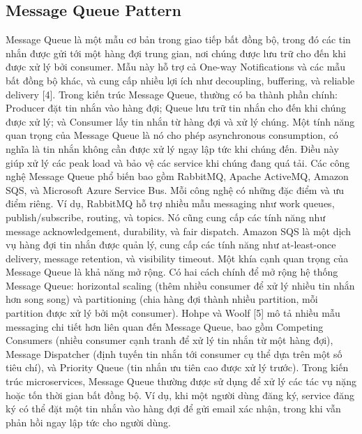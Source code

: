 \subsection{Message Queue Pattern}
Message Queue là một mẫu cơ bản trong giao tiếp bất đồng bộ, trong đó các tin nhắn được gửi tới một hàng đợi trung gian, nơi chúng được lưu trữ cho đến khi được xử lý bởi consumer. Mẫu này hỗ trợ cả One-way Notifications và các mẫu bất đồng bộ khác, và cung cấp nhiều lợi ích như decoupling, buffering, và reliable delivery [4].
Trong kiến trúc Message Queue, thường có ba thành phần chính: Producer đặt tin nhắn vào hàng đợi; Queue lưu trữ tin nhắn cho đến khi chúng được xử lý; và Consumer lấy tin nhắn từ hàng đợi và xử lý chúng. Một tính năng quan trọng của Message Queue là nó cho phép asynchronous consumption, có nghĩa là tin nhắn không cần được xử lý ngay lập tức khi chúng đến. Điều này giúp xử lý các peak load và bảo vệ các service khi chúng đang quá tải.
Các công nghệ Message Queue phổ biến bao gồm RabbitMQ, Apache ActiveMQ, Amazon SQS, và Microsoft Azure Service Bus. Mỗi công nghệ có những đặc điểm và ưu điểm riêng. Ví dụ, RabbitMQ hỗ trợ nhiều mẫu messaging như work queues, publish/subscribe, routing, và topics. Nó cũng cung cấp các tính năng như message acknowledgement, durability, và fair dispatch. Amazon SQS là một dịch vụ hàng đợi tin nhắn được quản lý, cung cấp các tính năng như at-least-once delivery, message retention, và visibility timeout.
Một khía cạnh quan trọng của Message Queue là khả năng mở rộng. Có hai cách chính để mở rộng hệ thống Message Queue: horizontal scaling (thêm nhiều consumer để xử lý nhiều tin nhắn hơn song song) và partitioning (chia hàng đợi thành nhiều partition, mỗi partition được xử lý bởi một consumer).
Hohpe và Woolf [5] mô tả nhiều mẫu messaging chi tiết hơn liên quan đến Message Queue, bao gồm Competing Consumers (nhiều consumer cạnh tranh để xử lý tin nhắn từ một hàng đợi), Message Dispatcher (định tuyến tin nhắn tới consumer cụ thể dựa trên một số tiêu chí), và Priority Queue (tin nhắn ưu tiên cao được xử lý trước).
Trong kiến trúc microservices, Message Queue thường được sử dụng để xử lý các tác vụ nặng hoặc tốn thời gian bất đồng bộ. Ví dụ, khi một người dùng đăng ký, service đăng ký có thể đặt một tin nhắn vào hàng đợi để gửi email xác nhận, trong khi vẫn phản hồi ngay lập tức cho người dùng.

